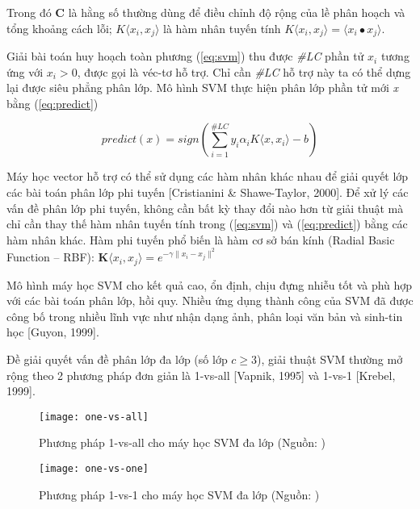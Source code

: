 Trong đó $\boldsymbol{C}$ là hằng số thường dùng để điều chỉnh độ rộng của lề phân hoạch và tổng khoảng cách lỗi; $K\langle x_i, x_j\rangle$ là hàm nhân tuyến tính $K \langle x_i, x_j \rangle = \langle x_i \bullet x_j \rangle$.\par

Giải bài toán huy hoạch toàn phương (\ref{eq:svm}) thu được \emph{\#LC} phần tử $x_i$ tương ứng với $x_i > 0$, được gọi là véc-tơ hỗ trợ. Chỉ cần \emph{\#LC} hỗ trợ này ta có thể dựng lại được siêu phẳng phân lớp. Mô hình SVM thực hiện phân lớp phần tử mới \emph{x} bằng (\ref{eq:predict})

\begin{equation}\label{eq:predict}
predict(x) = sign \left( \sum_{i=1}^{\#LC} y_i \alpha_i K\langle x, x_i \rangle - b \right)
\end{equation}

Máy học vector hỗ trợ có thể sử dụng các hàm nhân khác nhau để giải quyết lớp các bài toán phân lớp phi tuyến [Cristianini \& Shawe-Taylor, 2000]. Để xử lý các vấn đề phân lớp phi tuyến, không cần bất kỳ thay đổi nào hơn từ giải thuật mà chỉ cần thay thế hàm nhân tuyến tính trong (\ref{eq:svm}) và (\ref{eq:predict}) bằng các hàm nhân khác. Hàm phi tuyến phổ biến là hàm cơ sở bán kính (Radial Basic Function -- RBF): $\boldsymbol{K} \langle x_i, x_j \rangle = e^{-\gamma\|x_i - x_j\|^2}$ 

Mô hình máy học SVM cho kết quả cao, ổn định, chịu đựng nhiễu tốt và phù hợp với các bài toán phân lớp, hồi quy. Nhiều ứng dụng thành công của SVM đã được công bố trong nhiều lĩnh vực như nhận dạng ảnh, phân loại văn bản và sinh-tin học [Guyon, 1999].

Đề giải quyết vấn đề phân lớp đa lớp (số lớp $c \geq 3$), giải thuật SVM thường mở rộng theo 2 phương pháp đơn giản là 1-vs-all [Vapnik, 1995] và 1-vs-1 [Krebel, 1999].

\begin{figure}[h]
	\centering
	\texttt{[image: one-vs-all]}
	\caption[Phương pháp 1-vs-all cho máy học SVM đa lớp]{Phương pháp 1-vs-all cho máy học SVM đa lớp (Nguồn: \cite{khang2019})}
	\label{fig:2.11}
\end{figure}

\begin{figure}[h]
	\centering
	\texttt{[image: one-vs-one]}
	\caption[Phương pháp 1-vs-1 cho máy học SVM đa lớp]{Phương pháp 1-vs-1 cho máy học SVM đa lớp (Nguồn: \cite{khang2019})}
	\label{fig:2.12}
\end{figure}

